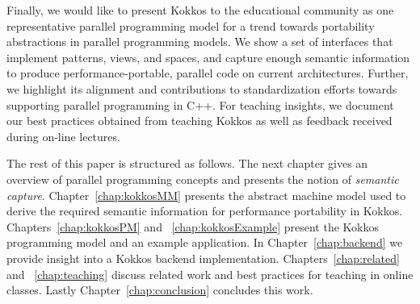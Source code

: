 Finally, we would like to present Kokkos to the educational community as one representative parallel programming model for a trend towards portability abstractions in parallel programming models. We show a set of interfaces that implement patterns, views, and spaces, and capture enough semantic information to produce performance-portable, parallel code on current architectures. Further, we highlight its alignment and contributions to standardization efforts towards supporting parallel programming in C++. For teaching insights, we document our best practices obtained from teaching Kokkos as well as feedback received during on-line lectures.

The rest of this paper is structured as follows. The next chapter gives an overview of parallel programming concepts and presents the notion of \emph{semantic capture}. Chapter~\ref{chap:kokkosMM} presents the abstract machine model used to derive the required semantic information for performance portability in Kokkos. Chapters~\ref{chap:kokkosPM} and ~\ref{chap:kokkosExample} present the Kokkos programming model and an example application. In Chapter~\ref{chap:backend} we provide insight into a Kokkos backend implementation. Chapters~\ref{chap:related} and ~\ref{chap:teaching} discuss related work and best practices for teaching in online classes. Lastly Chapter~\ref{chap:conclusion} concludes this work.

